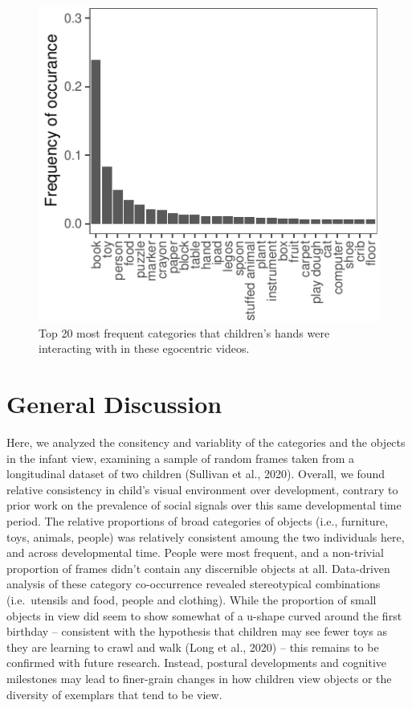 \documentclass[10pt, letterpaper]{article}
\newenvironment{CodeChunk}{}{}
\begin{document}
\begin{CodeChunk}
\begin{figure}[h]

{\centering \includegraphics{figs/freq_interact-1} 

}

\caption[Top 20 most frequent categories that children's hands were interacting with in these egocentric videos]{Top 20 most frequent categories that children's hands were interacting with in these egocentric videos.}\label{fig:freq_interact}
\end{figure}
\end{CodeChunk}

\hypertarget{general-discussion}{%
\section{General Discussion}\label{general-discussion}}

Here, we analyzed the consitency and variablity of the categories and
the objects in the infant view, examining a sample of random frames
taken from a longitudinal dataset of two children (Sullivan et al.,
2020). Overall, we found relative consistency in child's visual
environment over development, contrary to prior work on the prevalence
of social signals over this same developmental time period. The relative
proportions of broad categories of objects (i.e., furniture, toys,
animals, people) was relatively consistent amoung the two individuals
here, and across developmental time. People were most frequent, and a
non-trivial proportion of frames didn't contain any discernible objects
at all. Data-driven analysis of these category co-occurrence revealed
stereotypical combinations (i.e.~utensils and food, people and
clothing). While the proportion of small objects in view did seem to
show somewhat of a u-shape curved around the first birthday --
consistent with the hypothesis that children may see fewer toys as they
are learning to crawl and walk (Long et al., 2020) -- this remains to be
confirmed with future research. Instead, postural developments and
cognitive milestones may lead to finer-grain changes in how children
view objects or the diversity of exemplars that tend to be view.
\end{document}
